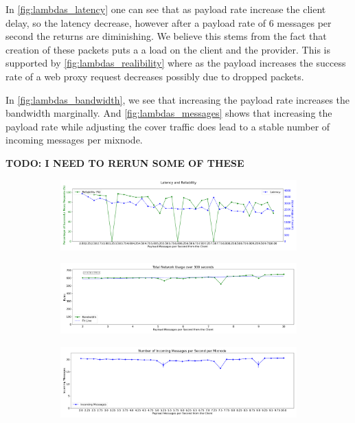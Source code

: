 \documentclass[a4paper,11pt,oneside]{report}
\begin{document}
In \autoref{fig:lambdas_latency} one can see that as payload rate increase the client delay, so the latency decrease, however after a payload rate of 6 messages per second the returns are diminishing. We believe this stems from the fact that creation of these packets puts a a load on the client and the provider. This is supported by \autoref{fig:lambdas_realibility} where as the payload increases the success rate of a web proxy request decreases possibly due to dropped packets.

In \autoref{fig:lambdas_bandwidth}, we see that increasing the payload rate increases the bandwidth marginally. And \autoref{fig:lambdas_messages} shows that increasing the payload rate while adjusting the cover traffic does lead to a stable number of incoming messages per mixnode.

\textbf{TODO: I NEED TO RERUN SOME OF THESE}

\begin{figure}[htbp]
    \centering
    \begin{subfigure}{\textwidth}
        \centering
        \includegraphics[width=\textwidth]{plots/lambdas_reliability_latency.png} %
        \caption{}
        \label{fig:lambdas_realibility}
    \end{subfigure}
    \hfill
    \begin{subfigure}{\textwidth}
        \centering
        \includegraphics[width=\textwidth]{plots/lambdas_bandwidth.png}
        \caption{}
        \label{fig:lambdas_bandwidth}
    \end{subfigure}
    \hfill
    \begin{subfigure}{\textwidth}
        \centering
        \includegraphics[width=\textwidth]{plots/lambdas_incoming_messages.png}
        \caption{}
        \label{fig:lambdas_messages}
    \end{subfigure}
\end{figure}
\end{document}
